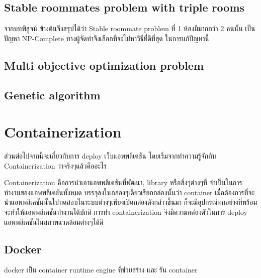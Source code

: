\subsection{Stable roommates problem with triple rooms}
\cite{srpnp}
จากบทพิสูจน์ ข้างต้นจึงสรุปได้ว่า Stable roommate problem ที่ 1 ห้องมีมากกว่า 2 คนนั้น
เป็นปัญหา NP-Complete ทางผู้จัดทำจึงเลือกที่จะไม่หาวิธีที่ดีที่สุด ในการแก้ปัญหานี้
\subsection{Multi objective optimization problem}

\subsection{Genetic algorithm}

\section{Containerization}
ส่วนต่อไปจากนี้จะเกี่ยวกับการ deploy เว็บแอพพลิเคชัน โดยเริ่มจากทำความรู้จักกับ 
Containerization ว่าจริงๆแล้วคืออะไร

Containerization\cite{ctnrh} คือการนำเอาแอพพลิเคชันที่พัฒนา, library หรือสิ่งๆต่างๆที่
จำเป็นในการทำงานของแอพพลิเคชันทั้งหมด บรรจุลงในกล่องๆเดียวเรียกกล่องนั้นว่า container 
เมื่อต้องการที่จะนำแอพพลิเคชันนั้นไปทดสอบในระบบต่างๆเพียงเปิดกล่องดังกล่าวขึ้นมา
ก็จะมีอุปกรณ์ทุกอย่างที่พร้อมจะทำให้แอพพลิเคชันทำงานได้ปกติ การทำ containerization 
จึงมีความคล่องตัวในการ deploy แอพพลิเคชันในสภาพแวดล้อมต่างๆได้ดี 

\subsection{Docker}
docker\cite{dke} เป็น container runtime engine ที่ช่วยสร้าง และ รัน container 



